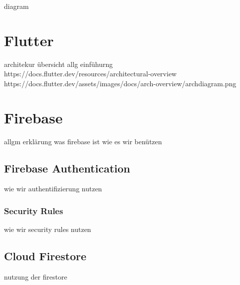 


diagram

\section{Flutter}
architekur übersicht allg einfühurng
https://docs.flutter.dev/resources/architectural-overview
https://docs.flutter.dev/assets/images/docs/arch-overview/archdiagram.png








\section{Firebase}
allgm erklärung was firebase ist 
wie es wir benützen


\subsection{Firebase Authentication}
wie wir authentifizierung nutzen
\subsubsection{Security Rules}
wie wir security rules nutzen
\subsection{Cloud Firestore}
nutzung der firestore
